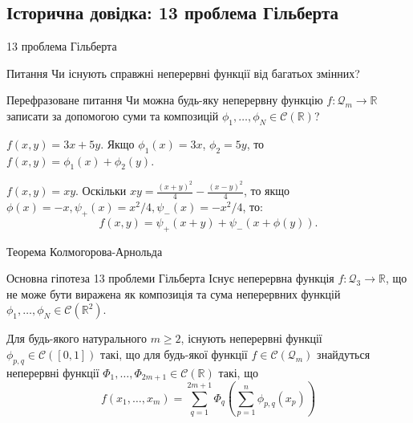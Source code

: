 \documentclass{zkdl-presentation-template}
\begin{document}
    \subsection{Історична довідка: 13 проблема Гільберта}
    \begin{frame}{13 проблема Гільберта}
        \begin{alertblock}{Питання}
            Чи існують справжні неперервні функції від багатьох змінних?\pause
        \end{alertblock}

        \begin{alertblock}{Перефразоване питання}
            Чи можна будь-яку неперервну функцію $f: \mathcal{Q}_m \to
            \mathbb{R}$ записати за допомогою суми та композицій
            $\phi_1,\dots,\phi_N \in \mathcal{C}(\mathbb{R})$?\pause
        \end{alertblock}

        \begin{example}
            $f(x,y) = 3x+5y$. Якщо
            $\phi_1(x)=3x$, $\phi_2=5y$, то 
            $f(x,y) = \phi_1(x)+\phi_2(y)$.\pause
        \end{example}

        \begin{example}
            $f(x,y) = xy$. Оскільки $xy=\frac{(x+y)^2}{4} - \frac{(x-y)^2}{4}$, 
            то якщо $\phi(x)=-x,\psi_+(x)=x^2/4,\psi_-(x)=-x^2/4$, то:
            \begin{equation*}
                f(x,y) = \psi_+(x+y) + \psi_-(x+\phi(y)).
            \end{equation*}
        \end{example}
    \end{frame}

    \begin{frame}{Теорема Колмогорова-Арнольда}
        \begin{block}{Основна гіпотеза 13 проблеми Гільберта}
            Існує неперервна функція $f: \mathcal{Q}_3 \to \mathbb{R}$, що не може бути
            виражена як композиція та сума неперервних функцій $\phi_1,\dots,\phi_N \in
            \mathcal{C}(\mathbb{R}^2)$.\pause
        \end{block}

        \begin{definition}
            Для будь-якого натурального $m \geq 2$, існують неперервні функції
            $\phi_{p,q} \in \mathcal{C}([0,1])$ такі, що для будь-якої функції $f \in
            \mathcal{C}(\mathcal{Q}_m)$ знайдуться неперервні функції
            $\Phi_1,\dots,\Phi_{2m+1} \in \mathcal{C}(\mathbb{R})$ такі, що
            \begin{equation*}
                f(x_1,\dots,x_m) = \sum_{q=1}^{2m+1}\Phi_q\left(\sum_{p=1}^n \phi_{p,q}(x_p)\right)
            \end{equation*}
        \end{definition}
    \end{frame}
\end{document}
